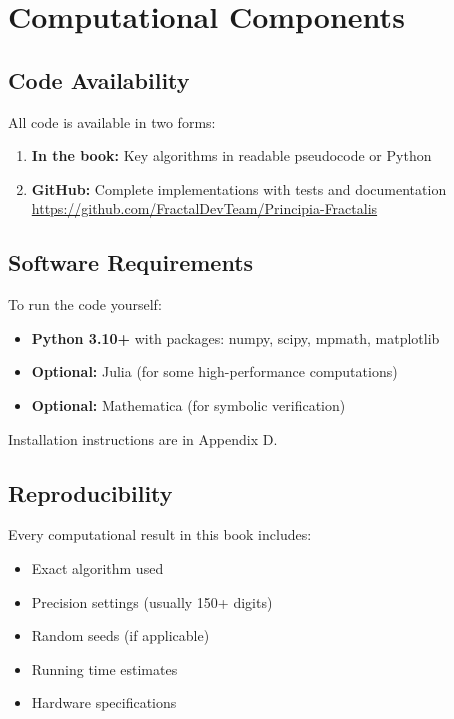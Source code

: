 \section*{Computational Components}

\subsection*{Code Availability}

All code is available in two forms:
\begin{enumerate}
\item \textbf{In the book:} Key algorithms in readable pseudocode or Python
\item \textbf{GitHub:} Complete implementations with tests and documentation\\
\url{https://github.com/FractalDevTeam/Principia-Fractalis}
\end{enumerate}

\subsection*{Software Requirements}

To run the code yourself:
\begin{itemize}
\item \textbf{Python 3.10+} with packages: numpy, scipy, mpmath, matplotlib
\item \textbf{Optional:} Julia (for some high-performance computations)
\item \textbf{Optional:} Mathematica (for symbolic verification)
\end{itemize}

Installation instructions are in Appendix D.

\subsection*{Reproducibility}

Every computational result in this book includes:
\begin{itemize}
\item Exact algorithm used
\item Precision settings (usually 150+ digits)
\item Random seeds (if applicable)
\item Running time estimates
\item Hardware specifications
\end{itemize}

